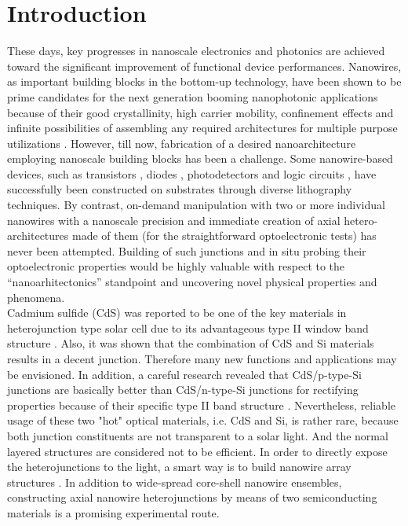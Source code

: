 \section{Introduction}
These days, key progresses in nanoscale electronics and photonics are achieved toward the significant improvement of functional device performances. Nanowires, as important building blocks in the bottom-up technology, have been shown to be prime candidates for the next generation booming nanophotonic applications because of their good crystallinity, high carrier mobility, confinement effects and infinite possibilities of assembling any required architectures for multiple purpose utilizations \cite{lieberprogramable2014,tsai2014,zhangx2014}. However, till now, fabrication of a desired nanoarchitecture employing nanoscale building blocks has been a challenge. Some nanowire-based devices, such as transistors \cite{577926446,577926447,577926448}, diodes \cite{577926449}, photodetectors \cite{577926451,tian2014photodetectors} and logic circuits \cite{577926453,577926454}, have successfully been constructed on substrates through diverse lithography techniques. By contrast, on-demand manipulation with two or more individual nanowires with a nanoscale precision and immediate creation of axial hetero-architectures made of them (for the straightforward optoelectronic tests) has never been attempted. Building of such junctions and in situ probing their optoelectronic properties would be highly valuable with respect to the “nanoarhitectonics” standpoint and uncovering novel physical properties and phenomena.\\ 

Cadmium sulfide (CdS) was reported to be one of the key materials in heterojunction type solar cell due to its advantageous type II window band structure  \cite{577926455}. Also, it was shown that the combination of CdS and Si materials results in a decent junction. Therefore many new functions and  applications may be envisioned. In addition, a careful research revealed that CdS/p-type-Si junctions are basically better than CdS/n-type-Si junctions for rectifying properties because of their specific type II band structure \cite{577926457}. Nevertheless, reliable usage of these two "hot" optical materials, i.e. CdS and Si, is rather rare, because both junction constituents are not transparent to a solar light. And the normal layered structures are considered not to be efficient. In order to directly expose the heterojunctions to the light, a smart way is to build nanowire array structures \cite{577926458,577926459}. In addition to wide-spread core-shell nanowire ensembles, constructing axial nanowire heterojunctions by means of two semiconducting materials is a promising experimental route.\\

